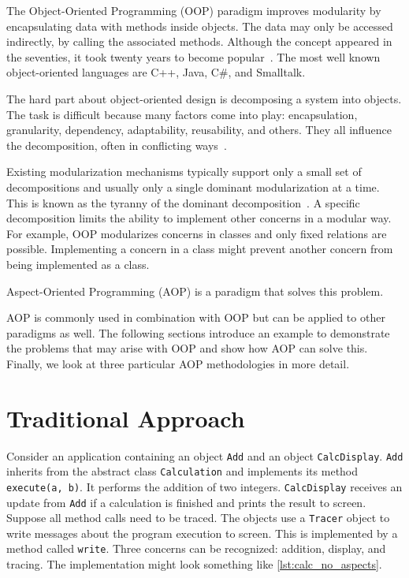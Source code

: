 The Object-Oriented Programming (OOP) paradigm improves modularity by encapsulating data with methods inside objects.
The data may only be accessed indirectly, by calling the associated methods.
Although the concept appeared in the seventies, it took twenty years to become popular~\cite{Watt90}.
The most well known object-oriented languages are C++, Java, C\#, and Smalltalk.

The hard part about object-oriented design is decomposing a system into objects.
The task is difficult because many factors come into play: encapsulation, granularity, dependency, adaptability, reusability, and others.
They all influence the decomposition, often in conflicting ways~\cite{Gamma95}.

Existing modularization mechanisms typically support only a small set of decompositions and usually only a single dominant modularization at a time.
This is known as the tyranny of the dominant decomposition~\cite{tarr:aosdbook05}.
A specific decomposition limits the ability to implement other concerns in a modular way.
For example, OOP modularizes concerns in classes and only fixed relations are possible.
Implementing a concern in a class might prevent another concern from being implemented as a class.

Aspect-Oriented Programming (AOP) is a paradigm that solves this problem.

AOP is commonly used in combination with OOP but can be applied to other paradigms as well.
The following sections introduce an example to demonstrate the problems that may arise with OOP and show how AOP can solve this.
Finally, we look at three particular AOP methodologies in more detail.

\section{Traditional Approach}

Consider an application containing an object \lstinline|Add| and an object \lstinline|CalcDisplay|.
\lstinline|Add| inherits from the abstract class \lstinline|Calculation| and implements its method \lstinline|execute(a, b)|. 
It performs the addition of two integers.
\lstinline|CalcDisplay| receives an update from \lstinline|Add| if a calculation is finished and prints the result to screen.
Suppose all method calls need to be traced.
The objects use a \lstinline|Tracer| object to write messages about the program execution to screen.
This is implemented by a method called \lstinline|write|.
Three concerns can be recognized: addition, display, and tracing.
The implementation might look something like \autoref{lst:calc_no_aspects}.


